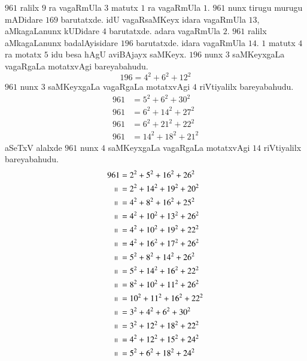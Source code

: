 $961$ ralilx $9$ ra vagaRmUla $3$ matutx $1$ ra vagaRmUla $1$. $961$ nunx tirugu murugu mADidare $169$ barutatxde. idU vagaRsaMKeyx idara vagaRmUla $13$, aMka\-gaLanunx kUDidare $4$ barutatxde. adara vagaRmUla $2$. $961$ ralilx aMkagaLanunx badalAyi\-sidare $196$ barutatxde. idara vagaRmUla $14$. $1$ matutx $4$ ra motatx $5$ idu besa hAgU aviBAjayx saMKeyx. $196$ nunx $3$ saMKeyxgaLa vagaRgaLa motatxvAgi bareyabahudu.
$$
196 = 4^2+6^2+12^2
$$
$961$ nunx $3$ saMKeyxgaLa vagaRgaLa motatxvAgi $4$ riVtiyalilx bareyabahudu.
\begin{align*}
961 &= 5^2+6^2+30^2\\
961 &= 6^2+14^2+27^2\\
961 &= 6^2+21^2+22^2\\
961 &= 14^2+18^2+21^2
\end{align*}
aSeTxV alalxde $961$ nunx $4$ saMKeyxgaLa vagaRgaLa motatxvAgi $14$ riVtiyalilx bareyabahudu.
\begin{align*}
961 &= 2^2+5^2+16^2+26^2\\
\shortparallel~   &= 2^2+14^2+19^2+20^2\\
\shortparallel~   &= 4^2+8^2+16^2+25^2\\
\shortparallel~   &= 4^2+10^2+13^2+26^2\\
\shortparallel~   &= 4^2+10^2+19^2+22^2\\
\shortparallel~   &= 4^2+16^2+17^2+26^2\\
\shortparallel~   &= 5^2+8^2+14^2+26^2\\
\shortparallel~   &= 5^2+14^2+16^2+22^2\\
\shortparallel~   &= 8^2+10^2+11^2+26^2\\
\shortparallel~   &= 10^2+11^2+16^2+22^2\\
\shortparallel~   &= 3^2+4^2+6^2+30^2\\
\shortparallel~   &= 3^2+12^2+18^2+22^2\\
\shortparallel~   &= 4^2+12^2+15^2+24^2\\
\shortparallel~   &= 5^2+6^2+18^2+24^2
\end{align*}
